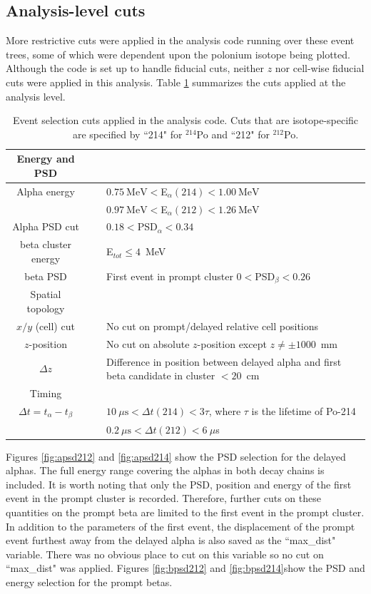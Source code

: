 \subsection{Analysis-level cuts}
More restrictive cuts were applied in the analysis code running over these event trees, some of which were dependent upon the polonium isotope being plotted.
Although the code is set up to handle fiducial cuts, neither $z$ nor cell-wise fiducial cuts were applied in this analysis. Table \ref{tab:analysiscuts} summarizes the cuts applied at the analysis level.
\begin{table}
\begin{center}
\caption{\label{tab:analysiscuts}Event selection cuts applied in the analysis code. Cuts that are isotope-specific are specified by ``214" for $^{214}$Po and ``212" for $^{212}$Po.}
\begin{tabular}[ht]{c c p{10.5cm}}\hline
Energy and PSD&~&~\\\hline\hline
Alpha energy &\vline& $0.75~\textrm{MeV}<$E$_{\alpha}(214)<1.00~\textrm{MeV}$\\
~&\vline&$0.97~\textrm{MeV}<$E$_{\alpha}(212)<1.26~\textrm{MeV}$  \\
Alpha PSD cut& \vline&$0.18<$PSD$_{\alpha}<0.34$\\
beta cluster energy &\vline& E$_{tot}\leq 4$~MeV\\
beta PSD & \vline&First event in prompt cluster $0<$PSD$_{\beta}<0.26$\\\hline
Spatial topology&~&~\\\hline\hline
$x/y$ (cell) cut &\vline& No cut on prompt/delayed relative cell positions\\
$z$-position&\vline& No cut on absolute $z$-position except $z\neq \pm1000$~mm\\
$\Delta z$&\vline&Difference in position between delayed alpha and first beta candidate in cluster $<20$~cm\\\hline
Timing&~&~\\\hline\hline
$\Delta t=t_{\alpha}-t_{\beta}$&\vline &$10~\mu\textrm{s}< \Delta t(214) < 3\tau$, where $\tau$ is the lifetime of Po-214 \\
~&\vline&$0.2~\mu\textrm{s}< \Delta t(212) < 6~\mu$s\\\hline

\end{tabular}
\end{center}
\end{table}

Figures \ref{fig:apsd212} and \ref{fig:apsd214} show the PSD selection for the delayed alphas. The full energy range covering the alphas in both decay chains is included.
It is worth noting that only the PSD, position and energy of the first event in the prompt cluster is recorded. Therefore, further cuts on these quantities on the prompt beta are limited to the first event in the prompt cluster. In addition to the parameters of the first event, the displacement of the prompt event furthest away from the delayed alpha is also saved as the ``max\_dist" variable. There was no obvious place to cut on this variable so no cut on ``max\_dist" was applied. Figures \ref{fig:bpsd212} and \ref{fig:bpsd214}show the PSD and energy selection for the prompt betas. 

